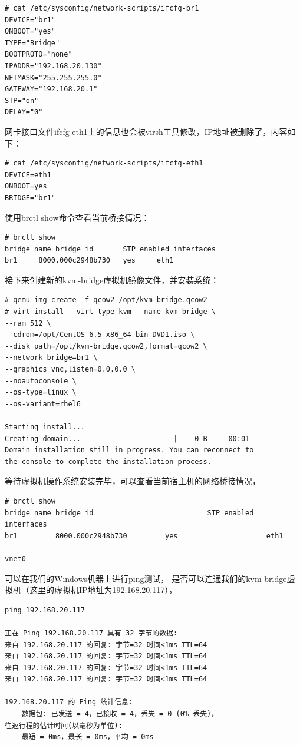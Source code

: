 \begin{verbatim}
# cat /etc/sysconfig/network-scripts/ifcfg-br1
DEVICE="br1"
ONBOOT="yes"
TYPE="Bridge"
BOOTPROTO="none"
IPADDR="192.168.20.130"
NETMASK="255.255.255.0"
GATEWAY="192.168.20.1"
STP="on"
DELAY="0"
\end{verbatim}

网卡接口文件ifcfg-eth1上的信息也会被virsh工具修改，IP地址被删除了，内容如下：

\begin{verbatim}
# cat /etc/sysconfig/network-scripts/ifcfg-eth1
DEVICE=eth1
ONBOOT=yes
BRIDGE="br1"
\end{verbatim}

使用brctl show命令查看当前桥接情况：

\begin{verbatim}
# brctl show
bridge name	bridge id		STP enabled	interfaces
br1		8000.000c2948b730	yes		eth1
\end{verbatim}

接下来创建新的kvm-bridge虚拟机镜像文件，并安装系统：

\begin{verbatim}
# qemu-img create -f qcow2 /opt/kvm-bridge.qcow2
# virt-install --virt-type kvm --name kvm-bridge \
--ram 512 \
--cdrom=/opt/CentOS-6.5-x86_64-bin-DVD1.iso \
--disk path=/opt/kvm-bridge.qcow2,format=qcow2 \
--network bridge=br1 \
--graphics vnc,listen=0.0.0.0 \
--noautoconsole \
--os-type=linux \
--os-variant=rhel6

Starting install...
Creating domain...                      |    0 B     00:01     
Domain installation still in progress. You can reconnect to 
the console to complete the installation process.
\end{verbatim}

等待虚拟机操作系统安装完毕，可以查看当前宿主机的网络桥接情况，

\begin{verbatim}
# brctl show
bridge name	bridge id			                STP enabled		interfaces
br1			8000.000c2948b730		  yes		              eth1
														              vnet0
\end{verbatim}

可以在我们的Windows机器上进行ping测试，
是否可以连通我们的kvm-bridge虚拟机（这里的虚拟机IP地址为192.168.20.117），

\begin{verbatim}
ping 192.168.20.117

正在 Ping 192.168.20.117 具有 32 字节的数据:
来自 192.168.20.117 的回复: 字节=32 时间<1ms TTL=64
来自 192.168.20.117 的回复: 字节=32 时间<1ms TTL=64
来自 192.168.20.117 的回复: 字节=32 时间<1ms TTL=64
来自 192.168.20.117 的回复: 字节=32 时间<1ms TTL=64

192.168.20.117 的 Ping 统计信息:
    数据包: 已发送 = 4，已接收 = 4，丢失 = 0 (0% 丢失)，
往返行程的估计时间(以毫秒为单位):
    最短 = 0ms，最长 = 0ms，平均 = 0ms
\end{verbatim}

